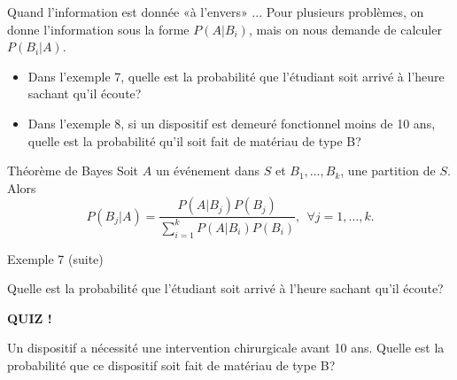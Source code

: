 \documentclass{BeamerTemplate}
\begin{document}
\begin{frame}[t]{Quand l'information est donnée «à l'envers» ...}
 Pour plusieurs problèmes, on donne l'information sous la forme $P(A|B_i)$,
 mais on nous demande de calculer $P(B_i|A)$.

 \begin{itemize}\itemsep 1cm
  \item Dans l'exemple 7, quelle est la probabilité que l'étudiant soit arrivé à l'heure sachant qu'il écoute?
  \item Dans l'exemple 8, si un dispositif est demeuré fonctionnel moins de 10 ans, quelle est la probabilité qu'il soit fait de matériau de type B?
 \end{itemize}
\end{frame}

\begin{frame}[t]%
 \begin{Boite}{Théorème de Bayes}
  Soit $A$ un événement dans $S$ et $B_1,\ldots,B_k$, une partition
  de $S$. Alors
  $$P(B_j|A)=\frac{P(A|B_j)P(B_j)}{\sum_{i=1}^kP(A|B_i)P(B_i)},\ \ \forall j=1,\ldots,k.$$
 \end{Boite}

\end{frame}

\begin{frame}[t]{Exemple 7 (suite)}

Quelle est la probabilité que l'étudiant soit arrivé à l'heure sachant qu'il écoute?

\end{frame}


\begin{frame}[plain,t]%


\centerline{\LARGE\bf\alert{QUIZ !}}

  \vspace{2mm}
  Un dispositif a nécessité une intervention chirurgicale avant 10 ans. Quelle est la probabilité que ce dispositif soit fait de matériau
  de type B?
 \vspace{5cm}

\end{frame}
\end{document}
